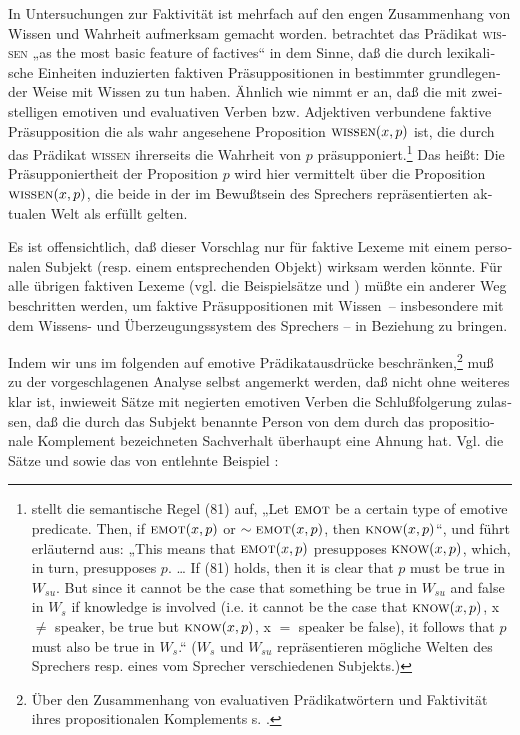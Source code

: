 \documentclass[output=paper]{langscibook}
\begin{document}
\begin{otherlanguage}{german}
In Untersuchungen zur Faktivität ist mehrfach auf den engen Zusammenhang von Wissen und Wahrheit aufmerksam gemacht worden. \citet[187]{kiefer1978factivity-in-hungarian} betrachtet das Prädikat \textsc{wissen} „as the most basic feature of factives“ in dem Sinne, daß die durch lexikalische Einheiten induzierten faktiven Präsuppositionen in bestimmter grundlegender Weise mit Wissen zu tun haben. Ähnlich wie \citet[414 ff.]{zuber1977decomposition-of-factives} nimmt er an, daß die mit zweistelligen emotiven und evaluativen Verben bzw. Adjektiven verbundene faktive Präsupposition die als wahr angesehene Proposition $\textsc{wissen}(x, p)$ ist, die durch das Prädikat \textsc{wissen} ihrerseits die Wahrheit von $p$ präsupponiert.\footnote{\label{fn:zi83:kiefer}\citet[190]{kiefer1978factivity-in-hungarian} stellt die semantische Regel (81) auf, „Let $\textsc{emot}$ be a certain type of emotive predicate. Then, if $\textsc{emot}(x, p)$ or $\sim\textsc{emot}(x, p)$, then $\textsc{know}(x, p)$“, und führt erläuternd aus: „This means that $\textsc{emot}(x, p)$ presupposes $\textsc{know}(x, p)$, which, in turn, presupposes $p$. … If (81) holds, then it is clear that $p$ must be true in $W_{su}$. But since it cannot be the case that something be true in $W_{su}$ and false in $W_{s}$ if knowledge is involved (i.e. it cannot be the case that $\textsc{know}(x, p)$, x $\neq$ speaker, be true but $\textsc{know}(x, p)$, x $=$ speaker be false), it follows that $p$ must also be true in $W_{s}$.“ ($W_{s}$ und $W_{su}$ repräsentieren mögliche Welten des Sprechers resp. eines vom Sprecher verschiedenen Subjekts.)} Das heißt: Die Präsupponiertheit der Proposition $p$ wird hier vermittelt über die Proposition $\textsc{wissen}(x, p)$, die beide in der im Bewußtsein des Sprechers repräsentierten aktualen Welt als erfüllt gelten.

Es ist offensichtlich, daß dieser Vorschlag nur für faktive Lexeme mit einem personalen Subjekt (resp. einem entsprechenden Objekt) wirksam werden könn\-te. Für alle übrigen faktiven Lexeme (vgl. die Beispielsätze  und ) müßte ein anderer Weg beschritten werden, um faktive Präsuppositionen mit Wissen~-- insbesondere mit dem Wissens- und Überzeugungssystem des Sprechers -- in Beziehung zu bringen.

Indem wir uns im folgenden auf emotive Prädikatausdrücke beschränken,\footnote{Über den Zusammenhang von evaluativen Prädikatwörtern und Faktivität ihres propositionalen Komplements s. \citet{Zimmermann82Explizite-und}.} muß zu der vorgeschlagenen Analyse selbst angemerkt werden, daß nicht ohne weiteres klar ist, inwieweit Sätze mit negierten emotiven Verben die Schlußfolgerung zulassen, daß die durch das Subjekt benannte Person von dem durch das propositionale Komplement bezeichneten Sachverhalt überhaupt eine Ahnung hat. Vgl. die Sätze  und  sowie das von \citet[22]{gazdar1978eine-pragmatisch-semantische-mischtheorie-der-bedeutung} entlehnte Beispiel :


\end{otherlanguage}
\end{document}

